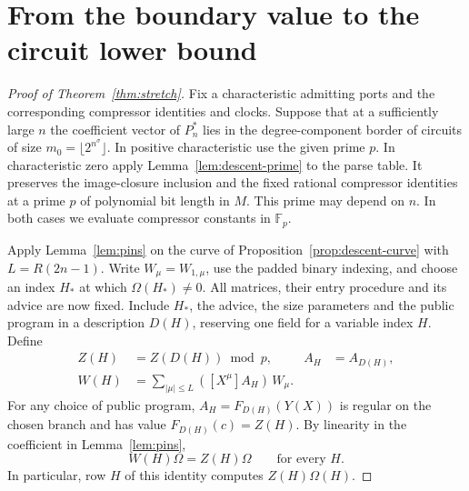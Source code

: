 \section{From the boundary value to the circuit lower bound}\label{sec:border}

\begin{proof}[Proof of Theorem~\ref{thm:stretch}]
Fix a characteristic admitting ports and the corresponding compressor
identities and clocks. Suppose that at a sufficiently large $n$ the
coefficient vector of $P_n^*$ lies in the degree-component border of
circuits of size $m_0=\lfloor 2^{n^\sigma}\rfloor$. In positive
characteristic use the given prime $p$. In characteristic zero apply
Lemma~\ref{lem:descent-prime} to the parse table. It preserves the
image-closure inclusion and the fixed rational compressor identities
at a prime $p$ of polynomial bit length in $M$. This prime may
depend on $n$. In both cases we evaluate compressor constants in
$\mathbb F_p$.

Apply Lemma~\ref{lem:pins} on the curve of
Proposition~\ref{prop:descent-curve} with $L=R(2n-1)$. Write
$W_\mu=W_{1,\mu}$, use the padded binary indexing, and choose an
index $H_*$ at which $\Omega(H_*)\ne0$. All matrices, their entry
procedure and its advice are now fixed. Include $H_*$, the advice,
the size parameters and the public program in a description $D(H)$,
reserving one field for a variable index $H$. Define
\[
 \begin{aligned}
 Z(H)&=Z(D(H))\bmod p, & A_H&=A_{D(H)},\\
 W(H)&=\sum_{|\mu|\le L}([X^\mu]A_H)\,W_\mu .
 \end{aligned}
\]
For any choice of public program, $A_H=F_{D(H)}(Y(X))$ is regular on the
chosen branch and has value $F_{D(H)}(c)=Z(H)$. By linearity in the
coefficient in Lemma~\ref{lem:pins},
\begin{equation}\label{eq:border-row}
                   W(H)\Omega=Z(H)\Omega\qquad\text{for every }H .
\end{equation}
In particular, row $H$ of this identity computes $Z(H)\Omega(H)$.


\end{proof}
